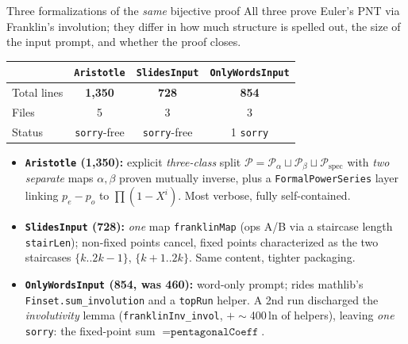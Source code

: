 \documentclass[10pt]{beamer}
\newcommand{\PP}{\mathcal{P}}
\begin{document}

\begin{frame}{Three formalizations of the \emph{same} bijective proof}
All three prove Euler's PNT via Franklin's involution; they differ in how much
structure is spelled out, the size of the input prompt, and whether the proof closes.
\centering\small
\begin{tabular}{@{}lccc@{}}
\toprule
 & \texttt{Aristotle} & \texttt{SlidesInput} & \texttt{OnlyWordsInput} \\
\midrule
Total lines        & \textbf{1{,}350}      & \textbf{728}        & \textbf{854} \\
Files              & 5                     & 3                   & 3 \\
Status             & \alert{\texttt{sorry}-free} & \alert{\texttt{sorry}-free} & 1 \texttt{sorry} \\
\bottomrule
\end{tabular}
\medskip

\footnotesize
\begin{itemize}
\item \textbf{\texttt{Aristotle} (1{,}350):} explicit \emph{three-class} split
      $\PP=\PP_\alpha\sqcup\PP_\beta\sqcup\PP_{\mathrm{spec}}$ with \emph{two separate}
      maps $\alpha,\beta$ proven mutually inverse, plus a \texttt{FormalPowerSeries}
      layer linking $p_e-p_o$ to $\prod(1-X^i)$. Most verbose, fully self-contained.
\item \textbf{\texttt{SlidesInput} (728):} \emph{one} map \texttt{franklinMap} (ops A/B
      via a staircase length \texttt{stairLen}); non-fixed points cancel, fixed points
      characterized as the two staircases $\{k..2k{-}1\}$, $\{k{+}1..2k\}$. Same content,
      tighter packaging.
\item \textbf{\texttt{OnlyWordsInput} (854, was 460):} word-only prompt; rides mathlib's
      \texttt{Finset.sum\_involution} and a \texttt{topRun} helper. A 2nd run discharged the
      \emph{involutivity} lemma (\texttt{franklinInv\_invol}, $+\sim$400\,ln of helpers),
      leaving \emph{one} \texttt{sorry}: the fixed-point sum $=\texttt{pentagonalCoeff}$.
\end{itemize}
\medskip
\end{frame}
\end{document}
